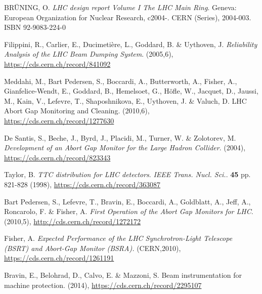 %
{\printbibliography}{

    \begin{thebibliography}{99}
	
         BR\"UNING, O. \emph{LHC design report Volume I The LHC
            Main Ring}. Geneva: European Organization for Nuclear Research, c2004-. CERN
            (Series), 2004-003. ISBN 92-9083-224-0

         Filippini, R., Carlier, E., Ducimetière, L., Goddard,
            B. \& Uythoven, J. \emph{Reliability Analysis of the LHC Beam Dumping System}.
            (2005,6), \url{https://cds.cern.ch/record/841092}

        Meddahi, M., Bart Pedersen, S., Boccardi, A.,
            Butterworth, A., Fisher, A., Gianfelice-Wendt, E., Goddard, B., Hemelsoet,
            G., Höfle, W., Jacquet, D., Jaussi, M., Kain, V., Lefevre, T., Shaposhnikova,
            E., Uythoven, J. \& Valuch, D. LHC Abort Gap Monitoring and Cleaning.
            (2010,6), \url{https://cds.cern.ch/record/1277630}

        De Santis, S., Beche, J., Byrd, J., Placidi, M.,
            Turner, W. \& Zolotorev, M. \emph{Development of an Abort Gap Monitor for the
            Large Hadron Collider}.  (2004), \url{https://cds.cern.ch/record/823343}

         Taylor, B. \emph{TTC distribution for LHC detectors}.
            {\em IEEE Trans. Nucl. Sci.}. \textbf{45} pp. 821-828 (1998),
            \url{https://cds.cern.ch/record/363087}



        Bart Pedersen, S., Lefevre, T., Bravin, E., Boccardi, A.,
            Goldblatt, A., Jeff, A., Roncarolo, F. \& Fisher, A. \emph{First Operation of
            the Abort Gap Monitors for LHC}.  (2010,5), \url{http://cds.cern.ch/record/1272172}

        Fisher, A. \emph{Expected Performance of the LHC
            Synchrotron-Light Telescope (BSRT) and Abort-Gap Monitor (BSRA).}
            (CERN,2010), \url{https://cds.cern.ch/record/1261191}

        Bravin, E., Belohrad, D., Calvo, E. \& Mazzoni, S. Beam
            instrumentation for machine protection.  (2014), \url{https://cds.cern.ch/record/2295107}


\end{thebibliography}}
